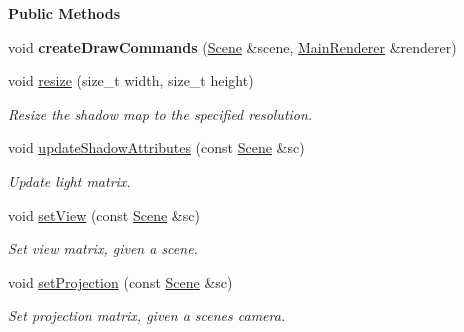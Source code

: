 \begin{Indent}\textbf{ Public Methods}\par
\begin{DoxyCompactItemize}
\item 
\mbox{\label{classrev_1_1_shadow_map_ae7e904ea50e634f634a63779e4889b68}} 
void {\bfseries create\+Draw\+Commands} (\mbox{\hyperlink{classrev_1_1_scene}{Scene}} \&scene, \mbox{\hyperlink{classrev_1_1_main_renderer}{Main\+Renderer}} \&renderer)
\item 
\mbox{\label{classrev_1_1_shadow_map_a4b7e86f89174d7b30b2753bd2244b22e}} 
void \mbox{\hyperlink{classrev_1_1_shadow_map_a4b7e86f89174d7b30b2753bd2244b22e}{resize}} (size\+\_\+t width, size\+\_\+t height)
\begin{DoxyCompactList}\small\item\em Resize the shadow map to the specified resolution. \end{DoxyCompactList}\item 
\mbox{\label{classrev_1_1_shadow_map_aa24b85e077db6eed5f7db075ff4fd076}} 
void \mbox{\hyperlink{classrev_1_1_shadow_map_aa24b85e077db6eed5f7db075ff4fd076}{update\+Shadow\+Attributes}} (const \mbox{\hyperlink{classrev_1_1_scene}{Scene}} \&sc)
\begin{DoxyCompactList}\small\item\em Update light matrix. \end{DoxyCompactList}\item 
\mbox{\label{classrev_1_1_shadow_map_a123bdfc85aa14bfbf66220fcb448dfd8}} 
void \mbox{\hyperlink{classrev_1_1_shadow_map_a123bdfc85aa14bfbf66220fcb448dfd8}{set\+View}} (const \mbox{\hyperlink{classrev_1_1_scene}{Scene}} \&sc)
\begin{DoxyCompactList}\small\item\em Set view matrix, given a scene. \end{DoxyCompactList}\item 
\mbox{\label{classrev_1_1_shadow_map_a04f1aa3499b2694e7a75e5ef44604706}} 
void \mbox{\hyperlink{classrev_1_1_shadow_map_a04f1aa3499b2694e7a75e5ef44604706}{set\+Projection}} (const \mbox{\hyperlink{classrev_1_1_scene}{Scene}} \&sc)
\begin{DoxyCompactList}\small\item\em Set projection matrix, given a scene\textquotesingle{}s camera. \end{DoxyCompactList}\end{DoxyCompactItemize}
\end{Indent}
